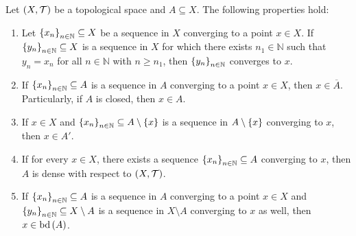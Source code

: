 \begin{proposition}
  Let $\left(X,\mathcal{T}\right)$ be a topological space and $A\subseteq X$. The following properties hold:

  \begin{enumerate}
    \item Let $\left\{x_n\right\}_{n\in\mathbb{N}}\subseteq X$ be a sequence in $X$ converging to a point $x\in X$. If $\left\{y_n\right\}_{n\in\mathbb{N}}\subseteq X$ is a sequence in $X$ for which there exists $n_1\in\mathbb{N}$ such that $y_n=x_n$ for all $n\in\mathbb{N}$ with $n\geq n_1$, then $\left\{y_n\right\}_{n\in\mathbb{N}}$ converges to $x$.
    \item If $\left\{x_n\right\}_{n\in\mathbb{N}}\subseteq A$ is a sequence in $A$ converging to a point $x\in X$, then $x\in\overline{A}$. Particularly, if $A$ is closed, then $x\in A$.
    \item If $x\in X$ and $\left\{x_n\right\}_{n\in\mathbb{N}}\subseteq A\setminus\left\{x\right\}$ is a sequence in $A\setminus\left\{x\right\}$ converging to $x$, then $x\in A'$.
    \item If for every $x\in X$, there exists a sequence $\left\{x_n\right\}_{n\in\mathbb{N}}\subseteq A$ converging to $x$, then $A$ is dense with respect to $\left(X,\mathcal{T}\right)$.
    \item If $\left\{x_n\right\}_{n\in\mathbb{N}}\subseteq A$ is a sequence in $A$ converging to a point $x\in X$ and $\left\{y_n\right\}_{n\in\mathbb{N}}\subseteq X\setminus A$ is a sequence in $X\setminus A$ converging to $x$ as well, then $x\in\operatorname{bd}\left(A\right)$.
  \end{enumerate}


\end{proposition}
